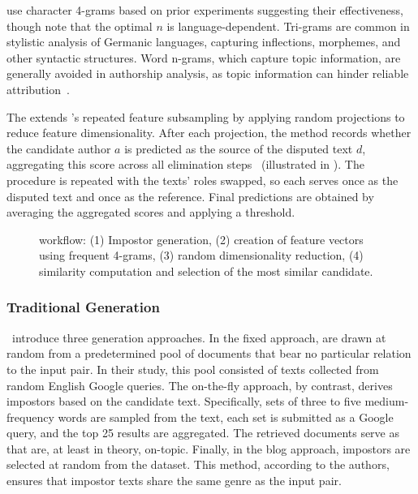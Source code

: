 \citet{koppel_determining_2014} use character 4-grams based on prior experiments suggesting their effectiveness, though \citet{neal_surveying_2018} note that the optimal $n$ is language-dependent. 
Tri-grams are common in stylistic analysis of Germanic languages, capturing inflections, %
morphemes, %
and other syntactic structures. 
Word n-grams, which capture topic information, are generally avoided in authorship analysis, as topic information can hinder reliable attribution~\citep{neal_surveying_2018,Sapkota_ngrams_2015}.

The \impAppr{} extends \unmasking{}'s repeated feature subsampling \citep{koppel_authorship_2004} by applying random projections to reduce feature dimensionality.
After each projection, the method records whether the candidate author $a$ is predicted as the source of the disputed text $d$, aggregating this score across all elimination steps~\citep{tyo_state_2022} (illustrated in ). 
The procedure is repeated with the texts' roles swapped, so each serves once as the disputed text and once as the reference. 
Final predictions are obtained by averaging the aggregated scores and applying a threshold.

\begin{figure}[htbp]
    \centering
    
    \caption[\impAppr{} workflow.]{\impAppr{} workflow: (1) Impostor generation, (2) creation of feature vectors using frequent 4-grams, (3) random dimensionality reduction, (4) similarity computation and selection of the most similar candidate.}
    \label{fig:impostor}
\end{figure}


\subsubsection{Traditional \Imp{} Generation}
\label{subsubsec:traditional_impostor_generation}

\citet{koppel_determining_2014}\ introduce three \imp{} generation approaches. 
In the fixed approach, \imps{} are drawn at random from a predetermined pool of documents that bear no particular relation to the input pair.
In their study, this pool consisted of texts collected from random English Google queries. 
The on-the-fly approach, by contrast, derives impostors based on the candidate text. 
Specifically, sets of three to five medium-frequency words are sampled from the text, each set is submitted as a Google query, and the top 25 results are aggregated. 
The retrieved documents serve as \imps{} that are, at least in theory, on-topic. 
Finally, in the blog approach, impostors are selected at random from the \dataBlog{} dataset. 
This method, according to the authors, ensures that impostor texts share the same genre as the input pair.

